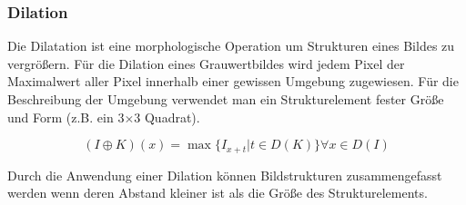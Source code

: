 \subsubsection*{Dilation}

Die Dilatation ist eine morphologische Operation um Strukturen eines Bildes zu
vergrößern.
Für die Dilation eines Grauwertbildes wird jedem Pixel der Maximalwert aller
Pixel innerhalb einer gewissen Umgebung zugewiesen.
Für die Beschreibung der Umgebung verwendet man ein Strukturelement fester
Größe und Form (z.B. ein 3$\times$3 Quadrat).

  \[ (I \oplus K)(x) =
       \max \{ I_{x+t} | t \in D(K) \} \forall x \in D(I) \]

Durch die Anwendung einer Dilation können Bildstrukturen zusammengefasst
werden wenn deren Abstand kleiner ist als die Größe des Strukturelements.
